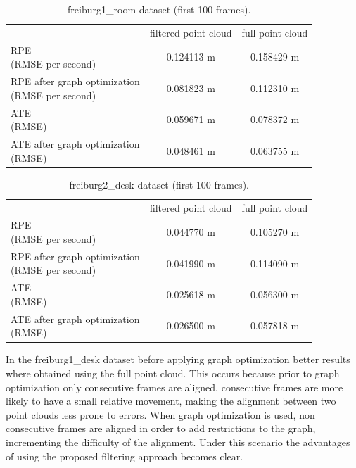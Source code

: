 \begin{center}
\begin{table}[H]
\begin{tabular}{ |l|c|c|}
\hline & filtered point cloud & full point cloud \\
\pbox{20cm} {RPE \\ (RMSE per second)} & 0.124113 m & 0.158429 m \\
\hline
\pbox{20cm}{RPE after graph optimization \\ (RMSE per second)} & 0.081823 m & 0.112310 m\\
\hline
\pbox{20cm} {ATE \\ (RMSE)} & 0.059671 m & 0.078372 m\\
\hline
\pbox{20cm} {ATE after graph optimization \\ (RMSE)} & 0.048461 m & 0.063755 m\\
\hline
\end{tabular}
\caption{freiburg1\_room dataset (first 100 frames).}
\label{table:quantroom}
\end{table}
\end{center}

\begin{center}
\begin{table}[H]
\begin{tabular}{ |l|c|c|}
\hline & filtered point cloud & full point cloud \\
\pbox{20cm}{RPE \\ (RMSE per second)} &  0.044770 m & 0.105270 m\\
\hline
\pbox{20cm} {RPE after graph optimization \\ (RMSE per second)} & 0.041990 m & 0.114090 m\\
\hline
\pbox{20cm} {ATE \\ (RMSE)} & 0.025618 m  & 0.056300 m\\
\hline
\pbox{20cm} {ATE after graph optimization \\ (RMSE)} & 0.026500 m & 0.057818 m \\
\hline
\end{tabular}
\caption{freiburg2\_desk dataset (first 100 frames).}
\label{table:quantfd2}
\end{table}
\end{center}

In the freiburg1\_desk dataset before applying graph optimization better results where obtained using 
the full point cloud. This occurs because prior to graph optimization only consecutive frames are aligned, 
consecutive frames are more likely to have a small relative movement, making the alignment between two point clouds 
less prone to 
errors. When graph optimization is used, non consecutive frames are aligned in order to add restrictions to the graph, 
incrementing the difficulty of 
the alignment. Under this scenario the advantages of using the proposed filtering approach becomes clear.


